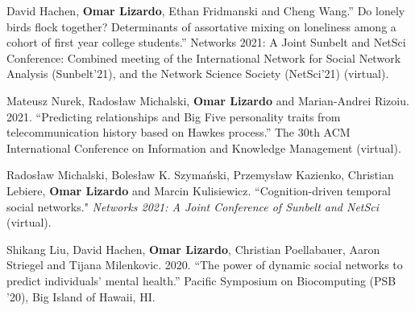 \ind David Hachen, {\bf Omar Lizardo}, Ethan Fridmanski and Cheng Wang.'' Do lonely birds flock together? Determinants of assortative mixing on loneliness among a cohort of first year college students.'' Networks 2021: A Joint Sunbelt and NetSci Conference: Combined meeting of the International Network for Social Network Analysis (Sunbelt'21), and the Network Science Society (NetSci'21) (virtual).

\ind Mateusz Nurek, Rados\l{}aw Michalski, {\bf Omar Lizardo} and Marian-Andrei Rizoiu. 2021. ``Predicting relationships and Big Five personality traits from telecommunication history based on Hawkes process.'' The 30th ACM International Conference on Information and Knowledge Management (virtual).

\ind Rados\l{}aw Michalski, Boles\l{}aw K. Szyma\'{n}ski, Przemys\l{}aw Kazienko, Christian Lebiere, {\bf Omar Lizardo} and Marcin Kulisiewicz. ``Cognition-driven temporal social networks." {\em Networks 2021: A Joint Conference of Sunbelt and NetSci} (virtual).

\ind Shikang Liu, David Hachen, {\bf Omar Lizardo}, Christian Poellabauer, Aaron Striegel and Tijana Milenkovic. 2020. ``The power of dynamic social networks to predict individuals' mental health.'' Pacific Symposium on Biocomputing (PSB '20), Big Island of Hawaii, HI. 
  

